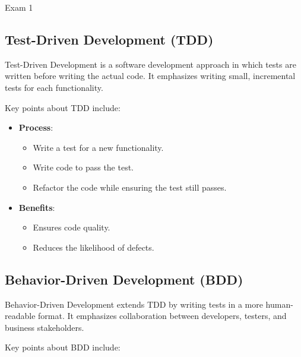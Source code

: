 \begin{examnotes}{Exam 1}
    \subsection*{Test-Driven Development (TDD)}
    
    Test-Driven Development is a software development approach in which tests are written before writing the actual code. It emphasizes writing small, incremental tests for each functionality.
    
    \begin{highlight}
        Key points about TDD include:
        
        \begin{itemize}
            \item \textbf{Process}:
                \begin{itemize}
                    \item Write a test for a new functionality.
                    \item Write code to pass the test.
                    \item Refactor the code while ensuring the test still passes.
                \end{itemize}
            \item \textbf{Benefits}:
                \begin{itemize}
                    \item Ensures code quality.
                    \item Reduces the likelihood of defects.
                \end{itemize}
        \end{itemize}
    \end{highlight}
    
    \subsection*{Behavior-Driven Development (BDD)}
    
    Behavior-Driven Development extends TDD by writing tests in a more human-readable format. It emphasizes collaboration between developers, testers, and business stakeholders.
    
    \begin{highlight}
        Key points about BDD include:
        

\end{highlight}
\end{examnotes}
